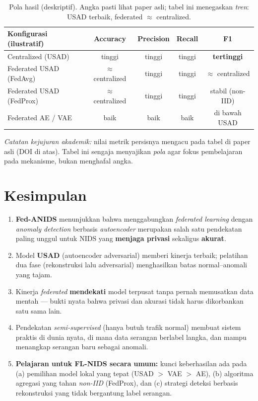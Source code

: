\documentclass[11pt,a4paper]{article}
\begin{document}
\begin{table}[h]
\centering
\footnotesize
\renewcommand{\arraystretch}{1.25}
\begin{tabular}{@{}lcccc@{}}
\toprule
\textbf{Konfigurasi (ilustratif)} & \textbf{Accuracy} & \textbf{Precision} &
\textbf{Recall} & \textbf{F1} \\
\midrule
Centralized (USAD)        & tinggi & tinggi & tinggi & \textbf{tertinggi} \\
Federated USAD (FedAvg)   & $\approx$ centralized & tinggi & tinggi & $\approx$ centralized \\
Federated USAD (FedProx)  & $\approx$ centralized & tinggi & tinggi & stabil (non-IID) \\
Federated AE / VAE        & baik & baik & baik & di bawah USAD \\
\bottomrule
\end{tabular}
\caption{Pola hasil (deskriptif). Angka pasti lihat paper asli; tabel ini
menegaskan \emph{tren}: USAD terbaik, federated $\approx$ centralized.}
\end{table}

\noindent\textit{Catatan kejujuran akademik:} nilai metrik persisnya mengacu
pada tabel di paper asli (DOI di atas). Tabel ini sengaja menyajikan \emph{pola}
agar fokus pembelajaran pada mekanisme, bukan menghafal angka.

\section{Kesimpulan}

\begin{enumerate}[leftmargin=1.4em]
  \item \textbf{Fed-ANIDS} menunjukkan bahwa menggabungkan \emph{federated
  learning} dengan \emph{anomaly detection} berbasis \emph{autoencoder}
  merupakan salah satu pendekatan paling unggul untuk NIDS yang
  \textbf{menjaga privasi} sekaligus \textbf{akurat}.
  \item Model \textbf{USAD} (autoencoder adversarial) memberi kinerja terbaik;
  pelatihan dua fase (rekonstruksi lalu adversarial) menghasilkan batas
  normal--anomali yang tajam.
  \item Kinerja \emph{federated} \textbf{mendekati} model terpusat tanpa pernah
  memusatkan data mentah --- bukti nyata bahwa privasi dan akurasi tidak harus
  dikorbankan satu sama lain.
  \item Pendekatan \emph{semi-supervised} (hanya butuh trafik normal) membuat
  sistem praktis di dunia nyata, di mana data serangan berlabel langka, dan
  mampu menangkap serangan baru sebagai anomali.
  \item \textbf{Pelajaran untuk FL-NIDS secara umum:} kunci keberhasilan ada
  pada (a) pemilihan model lokal yang tepat (USAD $>$ VAE $>$ AE), (b) algoritma
  agregasi yang tahan \emph{non-IID} (FedProx), dan (c) strategi deteksi berbasis
  rekonstruksi yang tidak bergantung label serangan.
\end{enumerate}
\end{document}
